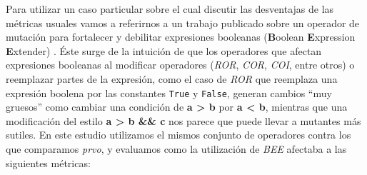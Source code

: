 Para utilizar un caso particular sobre el cual discutir las desventajas de las m\'etricas usuales vamos a referirnos a un trabajo publicado sobre un operador de mutaci\'on para fortalecer y debilitar expresiones booleanas (\textbf{B}oolean \textbf{E}xpression \textbf{E}xtender) \cite{bibliography.mutation.operators.beeBridaS17}. \'Este surge de la intuici\'on de que los operadores que afectan expresiones booleanas al modificar operadores (\emph{ROR}, \emph{COR}, \emph{COI}, entre otros) o reemplazar partes de la expresi\'on, como el caso de \emph{ROR} que reemplaza una expresi\'on boolena por las constantes \lstinline{True} y \lstinline{False}, generan cambios ``muy gruesos'' como cambiar una condici\'on de \textbf{a > b} por \textbf{a < b}, mientras que una modificaci\'on del estilo \textbf{a > b \&\& c} nos parece que puede llevar a mutantes m\'as sutiles. En este estudio utilizamos el mismos conjunto de operadores contra los que comparamos \emph{prvo}, y evaluamos como la utilizaci\'on de \emph{BEE} afectaba a las siguientes m\'etricas:
